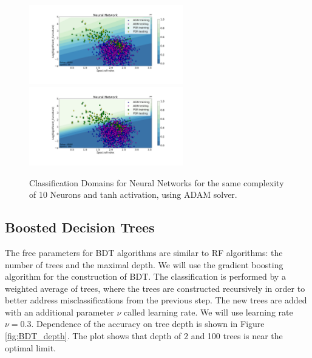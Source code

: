 \begin{figure}[h]
\hspace*{-1.5cm}
\includegraphics[width=0.6\textwidth]{plots/classification_domains/nn_adam_10_tanh_50_final.pdf}
\hspace*{-1.5cm}
\includegraphics[width=0.6\textwidth]{plots/classification_domains/nn_adam_10_tanh_300_final.pdf}
\caption{Classification Domains for Neural Networks for the same complexity of 10 Neurons and tanh activation, using ADAM solver. }
\label{fig:NN_domains}
\end{figure}

\subsection{Boosted Decision Trees}

The free parameters for BDT algorithms are similar to RF algorithms: the number of trees and the maximal depth.
We will use the gradient boosting algorithm for the construction of BDT.
The classification is performed by a weighted average of trees, where the trees are constructed recursively in order to better address 
misclassifications from the previous step. The new trees are added with an additional parameter $\nu$ called learning rate.
We will use learning rate $\nu = 0.3$.
Dependence of the accuracy on tree depth is shown in Figure \ref{fig:BDT_depth}. The plot shows that depth of 2 and 100 trees is near the optimal limit. 

